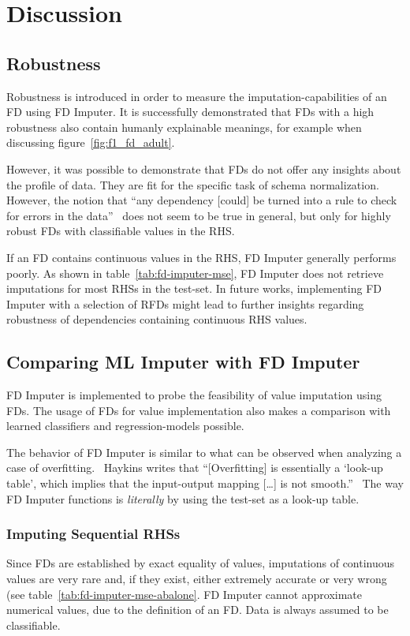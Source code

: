 \newpage
\section{Discussion}
\subsection{Robustness}
Robustness is introduced in order to measure the imputation-capabilities of an FD using FD Imputer.
It is successfully demonstrated that FDs with a high robustness also contain humanly explainable meanings, for example when discussing figure~\ref{fig:f1_fd_adult}.

However, it was possible to demonstrate that FDs do not offer any insights about the profile of data.
They are fit for the specific task of schema normalization.
However, the notion that ``any dependency [could] be turned into a rule to check for errors in the data''~\cite[p.~9]{ABE19} does not seem to be true in general, but only for highly robust FDs with classifiable values in the RHS.

If an FD contains continuous values in the RHS, FD Imputer generally performs poorly.
As shown in table~\ref{tab:fd-imputer-mse}, FD Imputer does not retrieve imputations for most RHSs in the test-set.
In future works, implementing FD Imputer with a selection of RFDs might lead to further insights regarding robustness of dependencies containing continuous RHS values.

\subsection{Comparing ML Imputer with FD Imputer}
FD Imputer is implemented to probe the feasibility of value imputation using FDs.
The usage of FDs for value implementation also makes a comparison with learned classifiers and regression-models possible.

The behavior of FD Imputer is similar to what can be observed when analyzing a case of overfitting.~\cite[p.~56]{SMO08}
Haykins writes that ``[Overfitting] is essentially a `look-up table', which implies that the input-output mapping [\dots] is not smooth.''~\cite[p.~165]{HAY08}
The way FD Imputer functions is \emph{literally} by using the test-set as a look-up table.

\subsubsection{Imputing Sequential RHSs}
Since FDs are established by exact equality of values, imputations of continuous values are very rare and, if they exist, either extremely accurate or very wrong (see table~\ref{tab:fd-imputer-mse-abalone}.
FD Imputer cannot approximate numerical values, due to the definition of an FD.
Data is always assumed to be classifiable.

